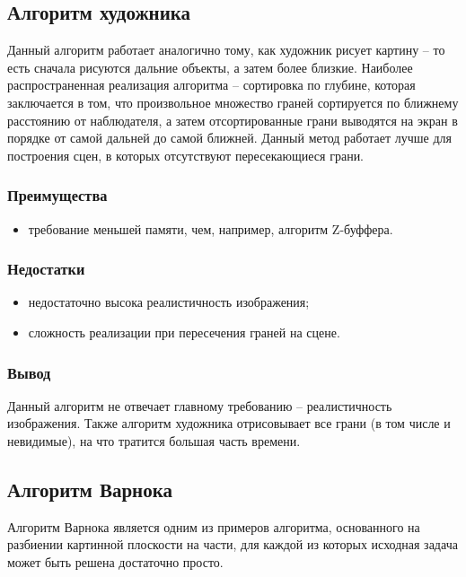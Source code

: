 \subsection*{Алгоритм художника}

Данный алгоритм работает аналогично тому, как художник рисует картину – то есть сначала рисуются дальние объекты, а затем более близкие. Наиболее распространенная реализация алгоритма – сортировка по глубине, которая заключается в том, что произвольное множество граней сортируется по ближнему расстоянию от наблюдателя, а затем отсортированные грани выводятся на экран в порядке от самой дальней до самой ближней. Данный метод работает лучше для построения сцен, в которых отсутствуют пересекающиеся грани. 

\subsubsection*{Преимущества}
\begin{itemize}
\item	требование меньшей памяти, чем, например, алгоритм Z-буффера.
\end{itemize}

\subsubsection*{Недостатки}
\begin{itemize}
\item	недостаточно высока реалистичность изображения;
\item	сложность реализации при пересечения граней на сцене.
\end{itemize}

\subsubsection*{Вывод}
Данный алгоритм не отвечает главному требованию – реалистичность изображения. Также алгоритм художника отрисовывает все грани (в том числе и невидимые), на что тратится большая часть времени.


\subsection*{Алгоритм Варнока}

 Алгоритм Варнока является одним из примеров алгоритма, основанного на разбиении картинной плоскости на части, для каждой из которых исходная задача может быть решена достаточно просто.
 
